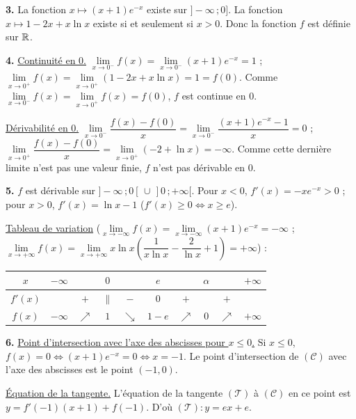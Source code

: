 \documentclass[11pt]{article}
\begin{document}
\textbf{3.} La fonction $x \mapsto (x + 1)e^{-x}$ existe sur $]-\infty\,;0]$. La fonction $x \mapsto 1 - 2x + x\ln x$ existe si et seulement si $x > 0$. Donc la fonction $f$ est définie sur $\mathbb{R}$.

\textbf{4.} \underline{Continuité en 0.} $\lim\limits_{x\to 0^-} f(x) = \lim\limits_{x\to 0^-}(x + 1)e^{-x} = 1$ ; $\lim\limits_{x\to 0^+} f(x) = \lim\limits_{x\to 0^+}(1 - 2x + x\ln x) = 1 = f(0)$. Comme $\lim\limits_{x\to 0^-} f(x) = \lim\limits_{x\to 0^+} f(x) = f(0)$, $f$ est continue en 0.

\underline{Dérivabilité en 0.} $\lim\limits_{x\to 0^-}\dfrac{f(x) - f(0)}{x} = \lim\limits_{x\to 0^-}\dfrac{(x + 1)e^{-x} - 1}{x} = 0$ ; $\lim\limits_{x\to 0^+}\dfrac{f(x) - f(0)}{x} = \lim\limits_{x\to 0^+}(-2 + \ln x) = -\infty$. Comme cette dernière limite n'est pas une valeur finie, $f$ n'est pas dérivable en 0.

\textbf{5.} $f$ est dérivable sur $]-\infty\,;0[\,\cup\,]0\,;+\infty[$. Pour $x < 0$, $f'(x) = -xe^{-x} > 0$ ; pour $x > 0$, $f'(x) = \ln x - 1$ ($f'(x) \ge 0 \Leftrightarrow x \ge e$).

\underline{Tableau de variation} ($\lim\limits_{x\to-\infty} f(x) = \lim\limits_{x\to-\infty}(x + 1)e^{-x} = -\infty$ ; $\lim\limits_{x\to+\infty} f(x) = \lim\limits_{x\to+\infty} x\ln x\left(\dfrac{1}{x\ln x} - \dfrac{2}{\ln x} + 1\right) = +\infty$) :
\begin{center}\renewcommand{\arraystretch}{1.4}
\begin{tabular}{|c|ccccccccc|}
\hline
$x$ & $-\infty$ & & $0$ & & $e$ & & $\alpha$ & & $+\infty$ \\
\hline
$f'(x)$ & & $+$ & $\|$ & $-$ & $0$ & $+$ & & $+$ & \\
\hline
$f(x)$ & $-\infty$ & $\nearrow$ & $1$ & $\searrow$ & $1 - e$ & $\nearrow$ & $0$ & $\nearrow$ & $+\infty$ \\
\hline
\end{tabular}
\end{center}

\textbf{6.} \underline{Point d'intersection avec l'axe des abscisses pour $x \le 0$.} Si $x \le 0$, $f(x) = 0 \Longleftrightarrow (x + 1)e^{-x} = 0 \Longleftrightarrow x = -1$. Le point d'intersection de $(\mathscr{C})$ avec l'axe des abscisses est le point $(-1, 0)$.

\underline{Équation de la tangente.} L'équation de la tangente $(\mathscr{T})$ à $(\mathscr{C})$ en ce point est $y = f'(-1)(x + 1) + f(-1)$. D'où $(\mathscr{T}) : y = ex + e$.
\end{document}
